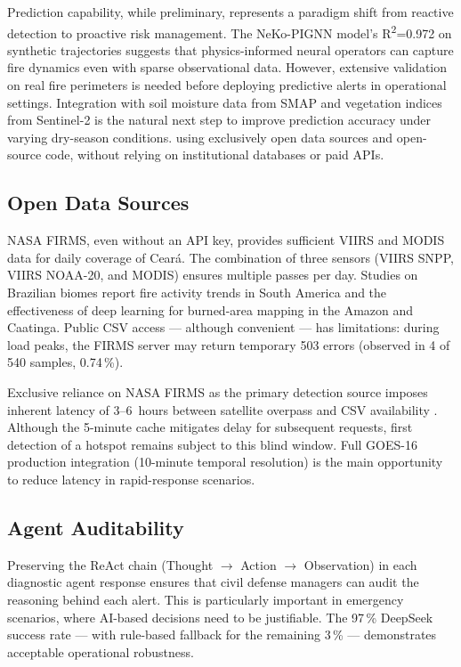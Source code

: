 \documentclass[preprint,times,numbers]{elsarticle}
\begin{document}
Prediction capability, while preliminary, represents a paradigm shift from reactive detection to proactive risk management. The NeKo-PIGNN model's R\textsuperscript{2}=0.972 on synthetic trajectories suggests that physics-informed neural operators can capture fire dynamics even with sparse observational data. However, extensive validation on real fire perimeters is needed before deploying predictive alerts in operational settings. Integration with soil moisture data from SMAP and vegetation indices from Sentinel-2 is the natural next step to improve prediction accuracy under varying dry-season conditions. using exclusively open data sources and open-source code, without relying on institutional databases or paid APIs.

\subsection{Open Data Sources}

NASA FIRMS, even without an API key, provides sufficient VIIRS and MODIS data for daily coverage of Cear\'{a}. The combination of three sensors (VIIRS SNPP, VIIRS NOAA-20, and MODIS) ensures multiple passes per day. Studies on Brazilian biomes \cite{article:mccarty2024,article:alves2023,article:arruda2025} report fire activity trends in South America and the effectiveness of deep learning for burned-area mapping in the Amazon and Caatinga. Public CSV access --- although convenient --- has limitations: during load peaks, the FIRMS server may return temporary 503 errors (observed in 4 of 540 samples, 0.74\,\%).

Exclusive reliance on NASA FIRMS as the primary detection source imposes inherent latency of 3--6~hours between satellite overpass and CSV availability \cite{manual:firms2024}. Although the 5-minute cache mitigates delay for subsequent requests, first detection of a hotspot remains subject to this blind window. Full GOES-16 production integration (10-minute temporal resolution) is the main opportunity to reduce latency in rapid-response scenarios.

\subsection{Agent Auditability}

Preserving the ReAct chain (Thought $\rightarrow$ Action $\rightarrow$ Observation) in each diagnostic agent response ensures that civil defense managers can audit the reasoning behind each alert. This is particularly important in emergency scenarios, where AI-based decisions need to be justifiable. The 97\,\% DeepSeek success rate --- with rule-based fallback for the remaining 3\,\% --- demonstrates acceptable operational robustness.
\end{document}
